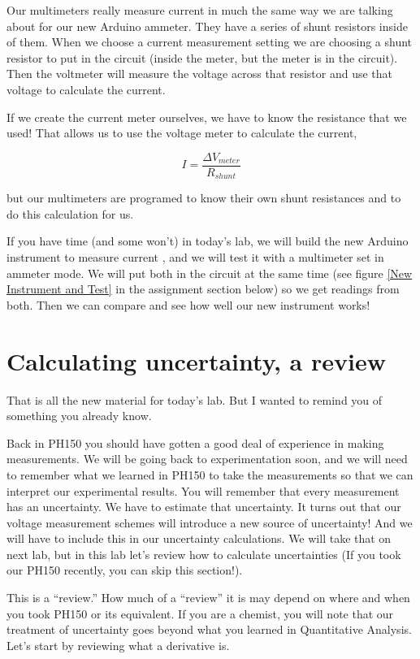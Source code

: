 Our multimeters really measure current in much the same way we are talking about for our new Arduino ammeter. They have a series of shunt resistors inside of them. When we choose a current measurement setting we are choosing a shunt resistor to put in the circuit (inside the meter, but the meter is in the circuit). Then the voltmeter will measure the voltage across that resistor and use that voltage to calculate the current.

If we create the current meter ourselves, we have to know the resistance that we used! That allows us to use the voltage meter to calculate the current,

\begin{equation*}
	I=\frac{\Delta V_{meter}}{R_{shunt}}
\end{equation*}

but our multimeters are programed to know their own shunt resistances and to do this calculation for us.

If you have time (and some won't) in today's lab, we will build the new Arduino instrument to measure current , and we will test it with a multimeter set in ammeter mode. We will put both in the circuit at the same time (see figure \ref{New Instrument and Test} in the assignment section below) so we get readings from both. Then we can compare and see how well our new instrument works!

\section{Calculating uncertainty, a review}

That is all the new material for today's lab. But I wanted to remind you of
something you already know.

Back in PH150 you should have gotten a good deal of experience in making
measurements. We will be going back to experimentation soon, and we will
need to remember what we learned in PH150 to take the measurements so that
we can interpret our experimental results. You will remember that every
measurement has an uncertainty. We have to estimate that uncertainty. It
turns out that our voltage measurement schemes will introduce a new source
of uncertainty! And we will have to include this in our uncertainty
calculations. We will take that on next lab, but in this lab let's review
how to calculate uncertainties (If you took our PH150 recently, you can skip this section!).

This is a ``review.'' How much of a ``review'' it is may depend on where and when you took PH150 or its equivalent. If you are a chemist, you will note that our treatment of uncertainty goes beyond what you learned in Quantitative Analysis. Let's start by reviewing what a derivative is.

